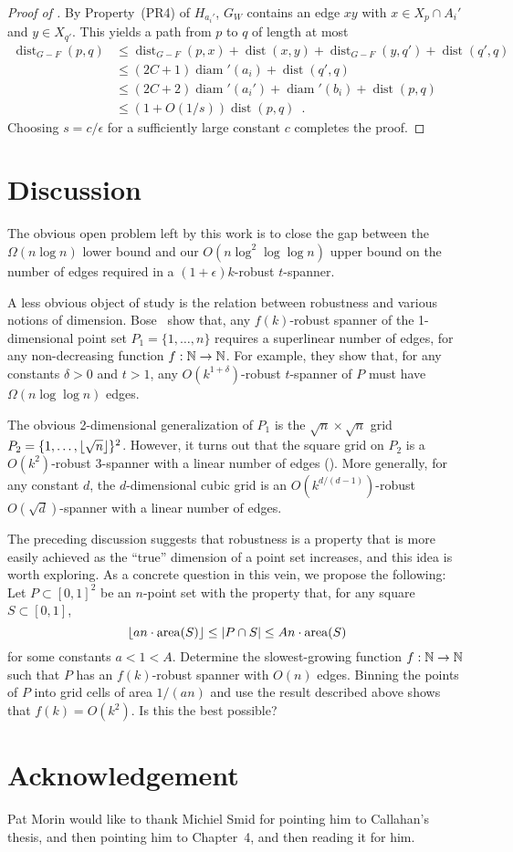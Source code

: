 \documentclass{patmorin}
\DeclareMathOperator{\diam}{diam}
\DeclareMathOperator{\dist}{dist}
\DeclareMathOperator{\ar}{area}
\begin{document}
\begin{proof}[Proof of ]
  By Property~(PR4) of $H_{a_i'}$, $G_W$ contains an edge $xy$ with $x\in X_p\cap A_i'$ and $y\in X_{q'}$.  
   This yields a path from $p$ to $q$ of length at most
  \begin{align*}
    \dist_{G-F}(p,q) & \le \dist_{G-F}(p,x) + \dist(x,y) + \dist_{G-F}(y,q') + \dist(q',q) \\
      & \le (2C+1)\diam'(a_i) + \dist(q',q) \\
      & \le (2C+2)\diam'(a_i') + \diam'(b_i) + \dist(p,q) \\
      & \le (1+O(1/s))\dist(p,q) \enspace . 
  \end{align*}
  Choosing $s = c/\epsilon$ for a sufficiently large constant $c$
  completes the proof.
\end{proof}

\section{Discussion}

The obvious open problem left by this work is to close the gap between the
$\Omega(n\log n)$ lower bound and our $O(n\log^2\log\log n)$ upper bound
on the number of edges required in a $(1+\epsilon)k$-robust $t$-spanner.

A less obvious object of study is the relation between robustness and
various notions of dimension.  Bose \etal\ show that, any $f(k)$-robust
spanner of the 1-dimensional point set $P_1=\{1,\ldots,n\}$ requires a
superlinear number of edges, for any non-decreasing function $f:\mathbb{N}\to\mathbb{N}$.
For example, they show that, for any constants $\delta>0$ and $t>1$, any
$O(k^{1+\delta})$-robust $t$-spanner of $P$ must have $\Omega(n\log\log
n)$ edges.

The obvious 2-dimensional generalization of $P_1$ is the
$\sqrt{n}\times\sqrt{n}$ grid $P_2=\{1,\ldots,{\lfloor \sqrt{n} \rfloor}\}^2$.
However, it turns out that the square grid on $P_2$ is a
$O(k^2)$-robust $3$-spanner with a linear number of edges
(\cite[Section~4]{bose.dujmovic.ea:robust}).  More generally, for any
constant $d$, the $d$-dimensional cubic grid is an $O(k^{d/(d-1)})$-robust
$O(\sqrt{d})$-spanner with a linear number of edges.

The preceding discussion suggests that robustness is a property that is
more easily achieved as the ``true'' dimension of a point set increases,
and this idea is worth exploring.  As a concrete question in this vein,
we propose the following:  Let $P\subset[0,1]^2$ be an $n$-point set
with the property that, for any square $S\subset [0,1]$,
\[
    \floor{an\cdot\ar(S)} \le |P\cap S| \le An\cdot\ar(S)
\]
for some constants $a < 1 < A$.  Determine the slowest-growing function
$f:\mathbb{N}\to\mathbb{N}$ such that $P$ has an $f(k)$-robust spanner with $O(n)$
edges.  Binning the points of $P$ into grid cells of area $1/(an)$ and
use the result described above shows that $f(k)=O(k^2)$.  Is this the
best possible?




\section*{Acknowledgement}

Pat Morin would like to thank Michiel Smid for pointing him to Callahan's thesis, and then pointing him to Chapter~4, and then reading it for him.




\end{document}
